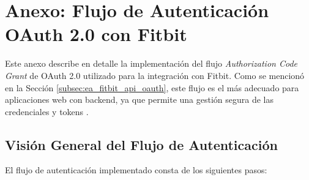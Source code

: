 \chapter{Anexo: Flujo de Autenticación OAuth 2.0 con Fitbit}
\label{anexo:oauth_fitbit}

Este anexo describe en detalle la implementación del flujo \textit{Authorization Code Grant} de OAuth 2.0 utilizado para la integración con Fitbit\textsuperscript{\textregistered}. Como se mencionó en la Sección \ref{subsec:ea_fitbit_api_oauth}, este flujo es el más adecuado para aplicaciones web con backend, ya que permite una gestión segura de las credenciales y tokens \cite{oauth2_spec}.

\section{Visión General del Flujo de Autenticación}

El flujo de autenticación implementado consta de los siguientes pasos:


